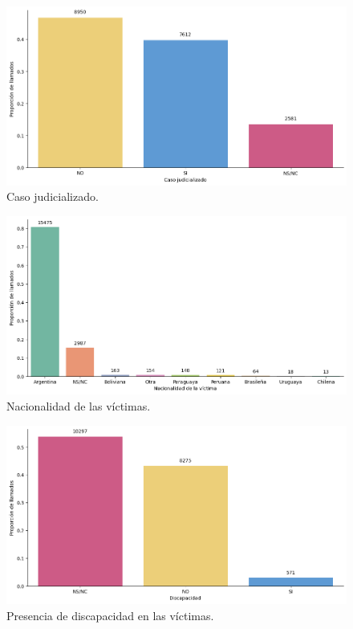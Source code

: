 \documentclass[10 pt]{article}
\begin{document}
\begin{figure}[H]
    \begin{center}
    \includegraphics[scale=.5]{images/latex_caso_judicializado.png}
    \caption{Caso judicializado.}
    \label{casojudicializado}
    \end{center}
    \end{figure}


\begin{figure}[H]
   \begin{center}
  \includegraphics[scale=.5]{images/latex_nacionalidad_victima.png}
 \caption{Nacionalidad de las víctimas.}
    \label{nacionalidad}
    \end{center}
    \end{figure}

 
    
    \begin{figure}[H]
        \begin{center}
        \includegraphics[scale=.5]{images/latex_victima_discapacidad.png}
        \caption{Presencia de discapacidad en las víctimas.}
        \label{discapacidad}
        \end{center}
        \end{figure}
    
\end{document}
